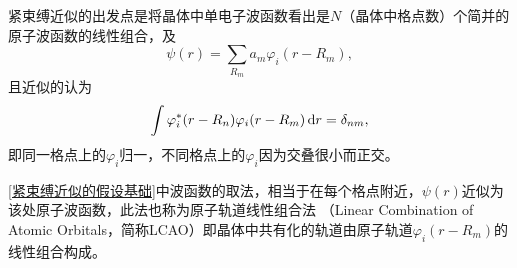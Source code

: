                 紧束缚近似的出发点是将晶体中单电子波函数看出是$N$（晶体中格点数）个简并的原子波函数的线性组合，及
                \begin{equation}
                    \psi(r)=\sum_{R_m}a_m\varphi_i(r-R_m)\label{紧束缚近似的假设基础},
                \end{equation}
                且近似的认为
                \begin{equation}
                    \int \varphi_i^*(r-R_n)\varphi_i(r-R_m)\mathop{}\!\mathrm{d} r=\delta_{nm}\label{格点波函数的正交归一性},
                \end{equation}
                即同一格点上的$\varphi_i$归一，不同格点上的$\varphi_i$因为交叠很小而正交。

                \autoref{紧束缚近似的假设基础}中波函数的取法，相当于在每个格点附近，$\psi(r)$近似为该处原子波函数，此法也称为原子轨道线性组合法
                （Linear Combination of Atomic Orbitals，简称LCAO）即晶体中共有化的轨道由原子轨道$\varphi_i(r-R_m)$的线性组合构成。
                
